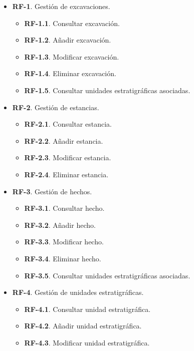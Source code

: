     \begin{itemize}
        \item \textbf{RF-1}. Gestión de excavaciones.
            \begin{itemize}
                \item \textbf{RF-1.1}. Consultar excavación.
                \item \textbf{RF-1.2}. Añadir excavación.
                \item \textbf{RF-1.3}. Modificar excavación.
                \item \textbf{RF-1.4}. Eliminar excavación.       
                \item \textbf{RF-1.5}. Consultar unidades estratigráficas asociadas.            
            \end{itemize}
        \item \textbf{RF-2}. Gestión de estancias.
            \begin{itemize}
                \item \textbf{RF-2.1}. Consultar estancia.
                \item \textbf{RF-2.2}. Añadir estancia.
                \item \textbf{RF-2.3}. Modificar estancia.
                \item \textbf{RF-2.4}. Eliminar estancia.       
            \end{itemize}
        \item \textbf{RF-3}. Gestión de hechos.
            \begin{itemize}
                \item \textbf{RF-3.1}. Consultar hecho.
                \item \textbf{RF-3.2}. Añadir hecho.
                \item \textbf{RF-3.3}. Modificar hecho.
                \item \textbf{RF-3.4}. Eliminar hecho. 
                \item \textbf{RF-3.5}. Consultar unidades estratigráficas asociadas.          
            \end{itemize}
        \item \textbf{RF-4}. Gestión de unidades estratigráficas.
            \begin{itemize}
                \item \textbf{RF-4.1}. Consultar unidad estratigráfica.
                \item \textbf{RF-4.2}. Añadir unidad estratigráfica.
                \item \textbf{RF-4.3}. Modificar unidad estratigráfica.

\end{itemize}
\end{itemize}
